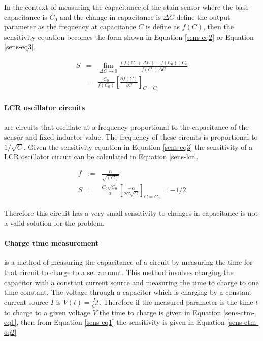 In the context of measuring the capacitance of the stain sensor where the base capacitance is $C_0$ and the change in capacitance is $\Delta C$ define the output parameter as the frequency at capacitance $C$ is define as $f(C)$, then the sensitivity equation becomes the form shown in Equation \ref{sens-eq2} or Equation \ref{sens-eq3}.

\begin{eqnarray}
	S&=&\lim_{\Delta C\rightarrow 0}\frac{\left(f\left(C_0+\Delta C\right)-f\left(C_0\right)\right)C_0}{ f(C_0)\Delta C}\label{sens-eq2}\\
	&=&\frac{C_0}{f(C_0)}\left[\frac{\partial f(C)}{\partial C}\right]_{C=C_0}\label{sens-eq3}
\end{eqnarray} 

\paragraph{LCR oscillator circuits} 
are circuits that oscillate at a frequency proportional to the capacitance of the sensor and fixed inductor value.  The frequency of these circuits is proportional to $1/\sqrt{C}$.  Given the sensitivity equation in Equation \ref{sens-eq3} the sensitivity of a LCR oscillator circuit can be calculated in Equation \ref{sens-lcr}.

\begin{eqnarray}
	f&:=&\frac{\alpha}{\sqrt{(C)}}\\
	S&=&\frac{C_0\sqrt{C_0}}{\alpha}\left[\frac{-\alpha}{2C\sqrt{C}}\right]_{C=C_0}=-1/2\label{sens-lcr}
\end{eqnarray} 

Therefore this circuit has a very small sensitivity to changes in capacitance is not a valid solution for the problem.

\paragraph{Charge time measurement} 
is a method of measuring the capacitance of a circuit by measuring the time for that circuit to charge to a set amount.  This method involves charging the capacitor with a constant current source and measuring the time to charge to one time constant.  The voltage through a capacitor which is charging by a constant current source $I$ is $V(t)=\frac{I}{C}t$.  Therefore if the measured parameter is the time $t$ to charge to a given voltage $V$ the time to charge is given in Equation \ref{sens-ctm-eq1}, then from Equation \ref{sens-eq1} the sensitivity is given in Equation \ref{sens-ctm-eq2}

